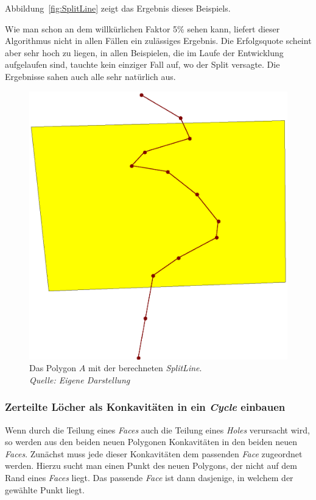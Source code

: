 Abbildung~\vref{fig:SplitLine} zeigt das Ergebnis dieses Beispiels. 

Wie man schon an dem willkürlichen Faktor 5\% sehen kann, liefert dieser Algorithmus nicht in allen Fällen ein zulässiges Ergebnis. Die Erfolgsquote scheint aber sehr hoch zu liegen, in allen Beispielen, die im Laufe der Entwicklung aufgelaufen sind, tauchte kein einziger Fall auf, wo der Split versagte. Die Ergebnisse sahen auch alle sehr natürlich aus.


\begin{figure}
	\centering
	\includegraphics[scale=0.6]{Ergebnis.eps}
	\caption[Polygon mit der berechneten SplitLine]{Das Polygon $A$ mit der berechneten \textit{SplitLine}.\\\textit{Quelle: Eigene Darstellung}}
	\label{fig:SplitLine}
\end{figure}

\clearpage
\subsubsection{Zerteilte Löcher als Konkavitäten in ein \textit{Cycle} einbauen}\label{JoinLL}

Wenn durch die Teilung eines \textit{Faces} auch die Teilung eines \textit{Holes} verursacht wird, so werden aus den beiden neuen Polygonen Konkavitäten in den beiden neuen \textit{Faces}. Zunächst muss jede dieser Konkavitäten dem passenden \textit{Face} zugeordnet werden. Hierzu sucht man einen Punkt des neuen Polygons, der nicht auf dem Rand eines \textit{Faces} liegt. Das passende \textit{Face} ist dann dasjenige, in welchem der gewählte Punkt liegt. 

